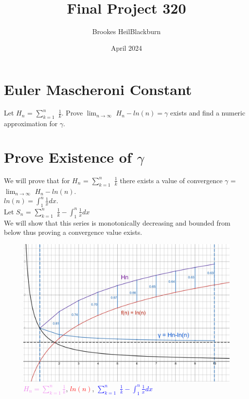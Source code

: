 \documentclass{article}
\title{Final Project 320}
\author{Brookes HeilBlackburn}
\date{April 2024}
\begin{document}
\maketitle

\section*{Euler Mascheroni Constant}
Let $H_n$ = $\sum_{k=1}^{n}$ $\frac{1}{k}$. Prove $ \lim_{n\to\infty}$ $H_n - ln(n) = \gamma$ exists and find a numeric approximation for $\gamma$.
\FloatBarrier
\section{Prove Existence of $\gamma$}
We will prove that for $H_n$ = $\sum_{k=1}^{n}$ $\frac{1}{k}$ there exists a value of convergence $\gamma$ = $ \lim_{n\to\infty}$ $H_n - ln(n)$. \\
$ln(n)=\int_{1}^{n} \frac{1}{x}dx$.\\
Let $S_n$ = $\sum_{k=1}^{n}$ $\frac{1}{k} - \int_{1}^{n} \frac{1}{x}dx$\\
We will show that this series is monotonically decreasing and bounded from below thus proving a convergence value exists.
\begin{center}
\FloatBarrier
\begin{figure}[htp]
    \centering
    \includegraphics[scale=0.1]{simplified gamma.png}
    \caption{\textcolor{violet}{$H_n = \sum_{k=1}^{n}\frac{1}{k}$}, \textcolor{red}{$ln(n)$}, \textcolor{blue}{$\sum_{k=1}^{n}$ $\frac{1}{k} - \int_{1}^{n} \frac{1}{x}dx$}}
    \label{fig:galaxy}
\end{figure}
\end{center}
\FloatBarrier
\end{document}
